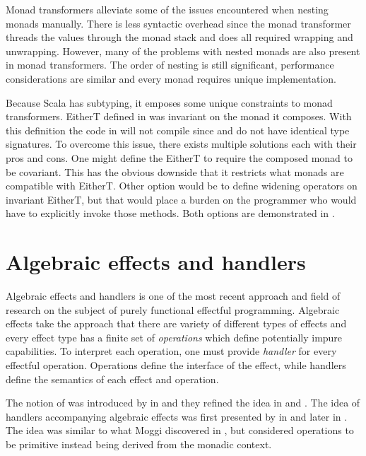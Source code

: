 

Monad transformers alleviate some of the issues encountered when nesting monads manually. There is less syntactic overhead since the monad transformer threads the values through the monad stack and does all required wrapping and unwrapping. However, many of the problems with nested monads are also present in monad transformers. The order of nesting is still significant, performance considerations are similar and every monad requires unique implementation. 

Because Scala has subtyping, it emposes some unique constraints to monad transformers. EitherT defined in  was invariant on the monad it composes. With this definition the code in  will not compile since  and  do not have identical type signatures. To overcome this issue, there exists multiple solutions each with their pros and cons. One might define the EitherT to require the composed monad to be covariant. This has the obvious downside that it restricts what monads are compatible with EitherT. Other option would be to define widening operators on invariant EitherT, but that would place a burden on the programmer who would have to explicitly invoke those methods. Both options are demonstrated in .





\section{Algebraic effects and handlers} \label{background:alg-eff}
Algebraic effects and handlers is one of the most recent approach and field of research on the subject of purely functional effectful programming. Algebraic effects take the approach that there are variety of different types of effects and every effect type has a finite set of \textit{operations} which define potentially impure capabilities. To interpret each operation, one must provide \textit{handler} for every effectful operation. Operations define the interface of the effect, while handlers define the semantics of each effect and operation.

The notion of  was introduced by \textcite{adequacy-for-alg-effs} in \citeyear{adequacy-for-alg-effs} and they refined the idea in \cite{comp-effs-and-ops} and \cite{alg-ops-gen-effs}. The idea of handlers accompanying algebraic effects was first presented by \textcite{handlers-of-alg-effs} in \citeyear{handlers-of-alg-effs} and later \textcite{handling-alg-effs} in \citeyear{handling-alg-effs}. The idea was similar to what Moggi discovered in \cite{notions-computations}, but \citeauthor{adequacy-for-alg-effs} considered operations to be primitive instead being derived from the monadic context.

